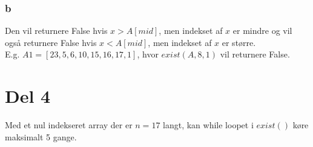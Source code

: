 \documentclass[a4paper]{article}
\begin{document}
\subsubsection*{b}
Den vil returnere False hvis $x > A[mid]$, men indekset af $x$ er mindre og vil også returnere False hvis $x < A[mid]$, men indekset af $x$ er større.  \\
E.g. $A1 = [23,5,6,10,15,16,17,1]$, hvor $exist(A,8,1)$ vil returnere False.

\section*{Del 4}
Med et nul indekseret array der er $n = 17$ langt, kan while loopet i $exist()$ køre maksimalt 5 gange.
\end{document}
